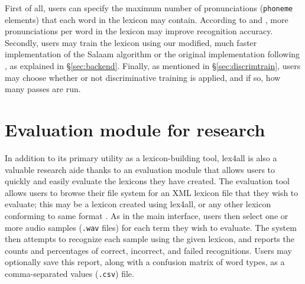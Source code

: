 \documentclass[11pt]{article}
\begin{document}
First of all, users
can specify the maximum number of pronunciations (\texttt{phoneme} elements) that each word in the lexicon may contain. According to  and , more pronunciations per word in the lexicon may 
improve recognition accuracy.
Secondly, users may train the lexicon using our modified, much faster implementation of the Salaam algorithm or the original implementation 
following , as explained in \S\ref{sec:backend}.
Finally, as mentioned in \S\ref{sec:discrimtrain}, users may choose whether or not discriminative training 
is applied, and if so, how many passes are run.





\section{Evaluation module for research}
\label{sec:evaluation}

In addition to its primary utility as a lexicon-building tool, lex4all is also a valuable research aide thanks to an evaluation module that allows users to quickly and easily evaluate the lexicons they have created. The evaluation tool allows users to browse their file system for an XML lexicon file that they wish to evaluate; this may be a lexicon created using lex4all, or any other lexicon conforming to same format \cite{pls}. 
As in the main interface, users then select one or more audio samples (\texttt{.wav} files) for each term they wish to evaluate.
The system then attempts to recognize each sample using the given lexicon, and reports the counts and percentages
of correct, incorrect, and failed recognitions.
Users may optionally save this report, along with a confusion matrix of word types, as a comma-separated values (\texttt{.csv}) file.
\end{document}
